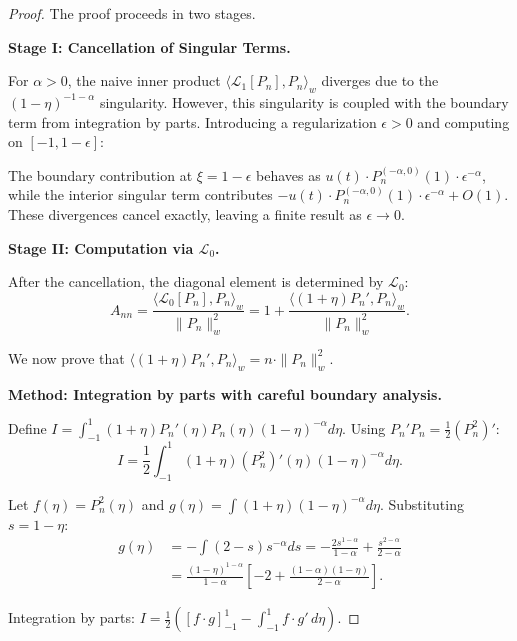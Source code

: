 \documentclass{article}
\theoremstyle{plain}
\theoremstyle{definition}
\theoremstyle{remark}
\begin{document}
\begin{proof}
	The proof proceeds in two stages.
	
	\textbf{Stage I: Cancellation of Singular Terms.}
	
	For $\alpha > 0$, the naive inner product $\langle \mathcal{L}_1[P_n], P_n \rangle_w$ diverges due to the $(1-\eta)^{-1-\alpha}$ singularity. However, this singularity is coupled with the boundary term from integration by parts. Introducing a regularization $\epsilon > 0$ and computing on $[-1, 1-\epsilon]$:
	
	The boundary contribution at $\xi = 1-\epsilon$ behaves as $u(t) \cdot P_n^{(-\alpha,0)}(1) \cdot \epsilon^{-\alpha}$, while the interior singular term contributes $-u(t) \cdot P_n^{(-\alpha,0)}(1) \cdot \epsilon^{-\alpha} + O(1)$. These divergences cancel exactly, leaving a finite result as $\epsilon \to 0$.
	
	\textbf{Stage II: Computation via $\mathcal{L}_0$.}
	
	After the cancellation, the diagonal element is determined by $\mathcal{L}_0$:
	\begin{equation}
		A_{nn} = \frac{\langle \mathcal{L}_0[P_n], P_n \rangle_w}{\|P_n\|_w^2} = 1 + \frac{\langle (1+\eta)P_n', P_n \rangle_w}{\|P_n\|_w^2}.
	\end{equation}
	
	We now prove that $\langle (1+\eta)P_n', P_n \rangle_w = n \cdot \|P_n\|_w^2$.
	
	\textbf{Method: Integration by parts with careful boundary analysis.}
	
	Define $I = \int_{-1}^{1} (1+\eta) P_n'(\eta) P_n(\eta) (1-\eta)^{-\alpha} d\eta$. Using $P_n' P_n = \frac{1}{2}(P_n^2)'$:
	\begin{equation}
		I = \frac{1}{2} \int_{-1}^{1} (1+\eta) (P_n^2)'(\eta) (1-\eta)^{-\alpha} d\eta.
	\end{equation}
	
	Let $f(\eta) = P_n^2(\eta)$ and $g(\eta) = \int (1+\eta)(1-\eta)^{-\alpha} d\eta$. Substituting $s = 1-\eta$:
	\begin{align}
		g(\eta) &= -\int (2-s) s^{-\alpha} ds = -\frac{2s^{1-\alpha}}{1-\alpha} + \frac{s^{2-\alpha}}{2-\alpha} \\
		&= \frac{(1-\eta)^{1-\alpha}}{1-\alpha}\left[-2 + \frac{(1-\alpha)(1-\eta)}{2-\alpha}\right].
	\end{align}
	
	Integration by parts: $I = \frac{1}{2}\left([f \cdot g]_{-1}^{1} - \int_{-1}^{1} f \cdot g' \, d\eta\right)$.
	

\end{proof}
\end{document}
